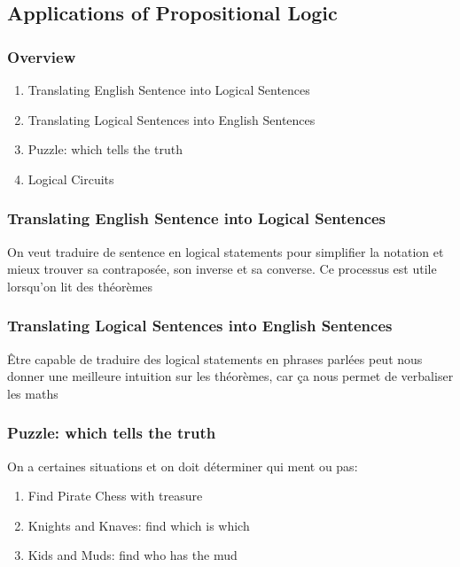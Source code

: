 \documentclass{article}
\begin{document}
\subsection{Applications of Propositional Logic}

\subsubsection{Overview}

\begin{enumerate}
    \item Translating English Sentence into Logical Sentences
    \item Translating Logical Sentences into English Sentences
    \item Puzzle: which tells the truth
    \item Logical Circuits
\end{enumerate}


\subsubsection{Translating English Sentence into Logical Sentences}

On veut traduire de sentence en logical statements pour simplifier la
notation et mieux trouver sa contraposée, son inverse et sa converse.
Ce processus est utile lorsqu'on lit des théorèmes

\subsubsection{Translating Logical Sentences into English Sentences}

Être capable de traduire des logical statements en phrases parlées
peut nous donner une meilleure intuition sur les théorèmes, car ça
nous permet de verbaliser les maths

\subsubsection{Puzzle: which tells the truth}

On a certaines situations et on doit déterminer qui ment ou pas:
\begin{enumerate}
    \item Find Pirate Chess with treasure
    \item Knights and Knaves: find which is which
    \item Kids and Muds: find who has the mud
\end{enumerate}
\end{document}
